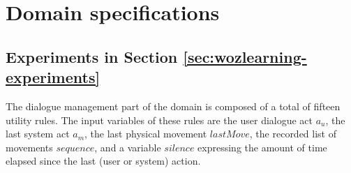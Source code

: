 
\chapter{Domain specifications}
\label{chap:domainspecs}

\section{Experiments in Section \ref{sec:wozlearning-experiments}}

The dialogue management part of the domain is composed of a total of fifteen utility rules.  The input variables of these rules are the user dialogue act $a_u$, the last system act $a_m$, the last physical movement $\mathit{lastMove}$, the recorded list of movements $\mathit{sequence}$, and a variable $\mathit{silence}$ expressing the amount of time elapsed since the last (user or system) action.  

